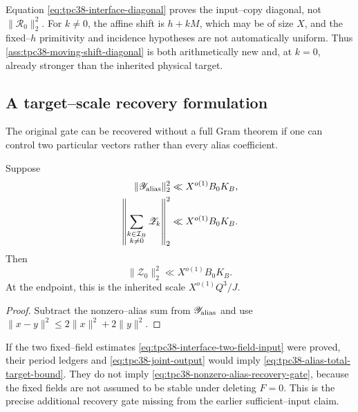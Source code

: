 \begin{remark}
\label{rem:tpc38-moving-diagonal-not-inherited}
Equation \eqref{eq:tpc38-interface-diagonal} proves the input--copy
diagonal, not \(\|\mathscr R_0\|_2^2\).  For \(k\ne0\), the affine shift is
\(h+kM\), which may be of size \(X\), and the fixed--\(h\) primitivity and
incidence hypotheses are not automatically uniform.  Thus
\cref{ass:tpc38-moving-shift-diagonal} is both arithmetically new and, at
\(k=0\), already stronger than the inherited physical target.
\end{remark}

\subsection{A target--scale recovery formulation}

The original gate can be recovered without a full Gram theorem if one can
control two particular vectors rather than every alias coefficient.

\begin{proposition}
\label{prop:tpc38-two-sum-recovery}
Suppose
\begin{align}
 \|\mathscr Y_{\rm alias}\|_2^2
 &\ll X^{o(1)}B_0K_B,
 \label{eq:tpc38-alias-total-target-bound}\\
 \left\|\sum_{\substack{k\in\mathcal I_B\\k\ne0}}\mathscr Z_k\right\|_2^2
 &\ll X^{o(1)}B_0K_B.
 \label{eq:tpc38-nonzero-alias-recovery-gate}
\end{align}
Then
\begin{equation}
 \|\mathscr Z_0\|_2^2\ll X^{o(1)}B_0K_B.
 \label{eq:tpc38-two-sum-recovered-output}
\end{equation}
At the endpoint, this is the inherited scale \(X^{o(1)}Q^3/J\).
\end{proposition}

\begin{proof}
Subtract the nonzero--alias sum from \(\mathscr Y_{\rm alias}\) and use
\(\|x-y\|^2\le2\|x\|^2+2\|y\|^2\).
\end{proof}

If the two fixed--field estimates
\eqref{eq:tpc38-interface-two-field-input} were proved, their period
ledgers and \eqref{eq:tpc38-joint-output} would imply
\eqref{eq:tpc38-alias-total-target-bound}.  They do not imply
\eqref{eq:tpc38-nonzero-alias-recovery-gate}, because the fixed fields are
not assumed to be stable under deleting \(F=0\).  This is the precise
additional recovery gate missing from the earlier sufficient--input claim.

